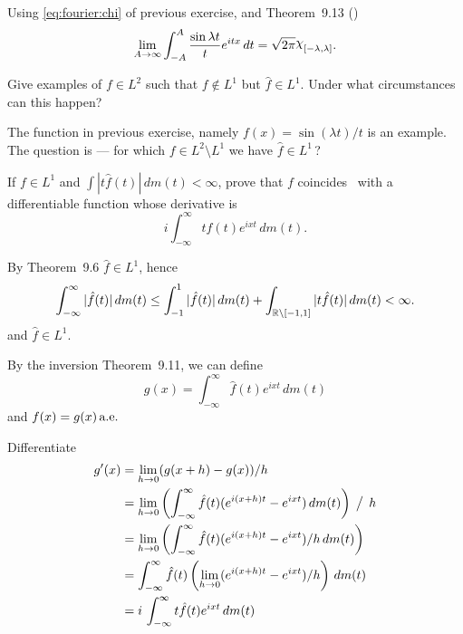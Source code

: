 \begin{enumerate}
Using \eqref{eq:fourier:chi} of previous exercise, 
and Theorem~9.13 (\cite{RudinRCA87})
\begin{equation*}
\lim_{A\to\infty} \int_{-A}^A \frac{\sin \lambda t}{t}e^{itx}\,dt
= \sqrt{2\pi} \chhi_{[-\lambda,\lambda]}.
\end{equation*}

\begin{excopy}
Give examples of \(f\in L^2\) such that \(f\notin L^1\)
but \(\hat{f}\in L^1\). Under what circumstances can this happen?
\end{excopy}

The function in previous exercise, namely \(f(x) = \sin(\lambda t)/t\) 
is an example. 
The question is --- for which \(f\in L^2\setminus L^1\)
we have \(\hat{f}\in L^1\)\,?

\begin{excopy}
If \(f\in L^1\) and \(\int|t\hat{f}(t)|\,dm(t) < \infty\),
prove that $f$ coincides \aded\ with a differentiable function
whose derivative is
\begin{equation*}
i \int_{-\infty}^\infty t\hat{f}(t)e^{ixt}\,dm(t).
\end{equation*}
\end{excopy}

By Theorem~9.6 \(\hat{f}\in L^1\), hence
\begin{equation*}
\int_{-\infty}^\infty |\hat{f}(t)|\,dm(t)
\leq \int_{-1}^1 |\hat{f}(t)|\,dm(t) 
     + \int_{\mathbb{R}\setminus[-1,1]} |t\hat{f}(t)|\,dm(t)
< \infty.
\end{equation*}
and \(\hat{f}\in L^1\).

By the inversion Theorem~9.11, we can define
\begin{equation*}
g(x) = \int_{-\infty}^\infty \hat{f}(t)e^{ixt}\,dm(t)
\end{equation*}
and \(f(x)=g(x)\,\textrm{a.e.}\)

Differentiate
\begin{align}
g'(x) 
&= \lim_{h\to 0} (g(x+h)-g(x))/h \notag \\
&= \lim_{h\to 0} 
    \left(
     \int_{-\infty}^\infty \hat{f}(t)(e^{i(x+h)t} - e^{ixt})\,dm(t)
    \right) \,\bigm/\, h \notag \\
&= \lim_{h\to 0} 
    \left(
     \int_{-\infty}^\infty \hat{f}(t)(e^{i(x+h)t} - e^{ixt})/h\,dm(t)
    \right) \notag \\
&= 
     \int_{-\infty}^\infty \hat{f}(t)
    \left(
          \lim_{h\to 0} (e^{i(x+h)t} - e^{ixt})/h
    \right) 
    \,dm(t)    \label{eq:ex9.5:lbgdom} \\
&= i\,\int_{-\infty}^\infty t\hat{f}(t)e^{ixt}\,dm(t) \notag
\end{align}


\end{enumerate}
